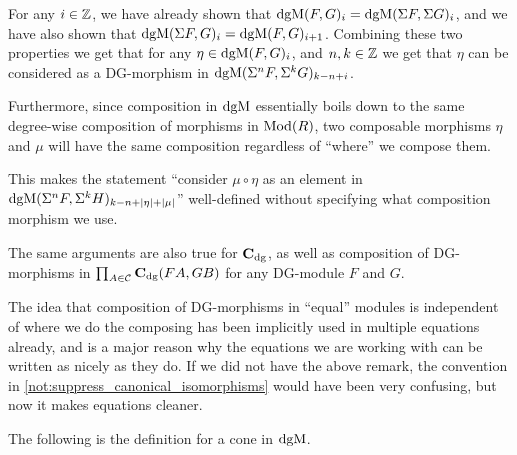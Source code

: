 \begin{remark}
    \label{rem:dgm_c_dg_super_degree_shift}
    For any \( i \in {\mathbb{Z}} \), we have already shown that \( \operatorname{dgM}(F, G)_i = \operatorname{dgM}(\Sigma F, \Sigma G)_i \), and we have also shown that \( \operatorname{dgM}(\Sigma F, G)_i = \operatorname{dgM}(F, G)_{i + 1} \). Combining these two properties we get that for any \( \eta \in \operatorname{dgM}(F, G)_i \), and \( n, k \in {\mathbb{Z}} \) we get that \( \eta \) can be considered as a DG-morphism in \( \operatorname{dgM}(\Sigma^n F, \Sigma^k G)_{k - n + i} \).

    Furthermore, since composition in \( \operatorname{dgM} \) essentially boils down to the same degree-wise composition of morphisms in \( \operatorname{Mod}(R) \), two composable morphisms \( \eta \) and \( \mu \) will have the same composition regardless of ``where'' we compose them.

    This makes the statement ``consider \( \mu \circ \eta \) as an element in \( \operatorname{dgM}(\Sigma^n F, \Sigma^k H)_{k - n + |\eta| + |\mu|} \)'' well-defined without specifying what composition morphism we use.

    The same arguments are also true for \( \operatorname{\mathbf{C}}_{\operatorname{dg}} \), as well as composition of DG-morphisms in \( \prod_{A \in {\mathcal{C}}} \operatorname{\mathbf{C}}_{\operatorname{dg}}(F A, G B) \) for any DG-module \( F \) and \( G \).
\end{remark}

The idea that composition of DG-morphisms in ``equal'' modules is independent of where we do the composing has been implicitly used in multiple equations already, and is a major reason why the equations we are working with can be written as nicely as they do. If we did not have the above remark, the convention in \autoref{not:suppress_canonical_isomorphisms} would have been very confusing, but now it makes equations cleaner.

The following is the definition for a cone in \( \operatorname{dgM} \).

